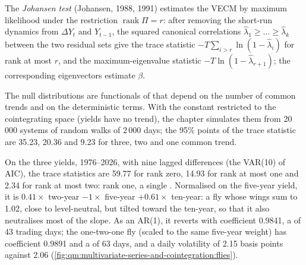 \begin{definition}\label{def:qm:multivariate-series-and-cointegration:johansen}
The \emph{Johansen test} (Johansen, 1988, 1991) estimates the VECM by maximum likelihood under the restriction $\operatorname{rank}\Pi = r$:
after removing the short-run dynamics from $\Delta Y_t$ and $Y_{t-1}$, the squared canonical correlations $\hat\lambda_1 \ge \dots \ge \hat\lambda_k$ between the two
residual sets give the trace statistic $-T\sum_{i>r}\ln(1 - \hat\lambda_i)$ for rank at most $r$, and the maximum-eigenvalue statistic $-T\ln(1 - \hat\lambda_{r+1})$;
the corresponding eigenvectors estimate $\beta$.
\end{definition}

The null distributions are functionals of  that depend on the number of common trends and on the deterministic terms. With the constant
restricted to the cointegrating space (yields have no trend), the chapter simulates them from 20\,000 systems of random walks of 2\,000 days; the 95\% points of the
trace statistic are 35.23, 20.36 and 9.23 for three, two and one common trend.

On the three yields, 1976--2026, with nine lagged differences (the VAR(10) of AIC), the trace statistics are 59.77 for rank zero, 14.93 for rank at most one
and 2.34 for rank at most two: rank one, a single . Normalised on the five-year yield, it is $0.41 \times$ two-year $- 1 \times$ five-year $+ 0.61
\times$ ten-year: a fly whose wings sum to 1.02, close to level-neutral, but tilted toward the ten-year, so that it also neutralises most of the slope. As an AR(1),
it reverts with coefficient 0.9841, a  of 43 trading days; the one-two-one fly (scaled to the same five-year weight) has coefficient 0.9891 and a 
of 63 days, and a daily volatility of 2.15 basis points against 2.06 (\cref{fig:qm:multivariate-series-and-cointegration:flies}).

